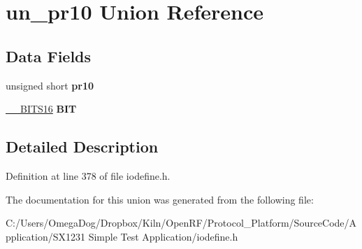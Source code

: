 \hypertarget{unionun__pr10}{\section{un\-\_\-pr10 Union Reference}
\label{unionun__pr10}
}
\subsection*{Data Fields}
\begin{DoxyCompactItemize}
\item 
\hypertarget{unionun__pr10_a5fe0d6a0ea51a3516d6fe41f316df659}{unsigned short {\bfseries pr10}}\label{unionun__pr10_a5fe0d6a0ea51a3516d6fe41f316df659}

\item 
\hypertarget{unionun__pr10_ab607301a65d8323d92cf764c3c9036be}{\hyperlink{struct_____b_i_t_s16}{\-\_\-\-\_\-\-B\-I\-T\-S16} {\bfseries B\-I\-T}}\label{unionun__pr10_ab607301a65d8323d92cf764c3c9036be}

\end{DoxyCompactItemize}


\subsection{Detailed Description}


Definition at line 378 of file iodefine.\-h.



The documentation for this union was generated from the following file\-:\begin{DoxyCompactItemize}
\item 
C\-:/\-Users/\-Omega\-Dog/\-Dropbox/\-Kiln/\-Open\-R\-F/\-Protocol\-\_\-\-Platform/\-Source\-Code/\-Application/\-S\-X1231 Simple Test Application/iodefine.\-h\end{DoxyCompactItemize}
